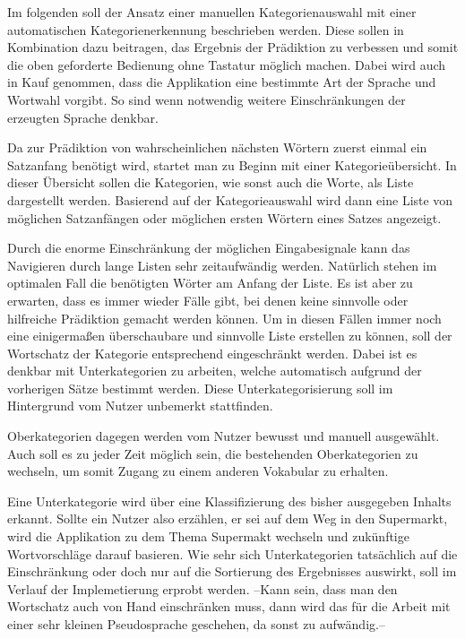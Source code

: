     	Im folgenden soll der Ansatz einer manuellen Kategorienauswahl mit einer automatischen Kategorienerkennung beschrieben werden. Diese sollen in Kombination dazu beitragen, das Ergebnis der Prädiktion zu verbessen und somit die oben geforderte Bedienung ohne Tastatur möglich machen. Dabei wird auch in Kauf genommen, dass die Applikation eine bestimmte Art der Sprache und Wortwahl vorgibt. So sind wenn notwendig weitere Einschränkungen der erzeugten Sprache denkbar.
        
    	Da zur Prädiktion von wahrscheinlichen nächsten Wörtern zuerst einmal ein Satzanfang benötigt wird, startet man zu Beginn mit einer Kategorieübersicht. In dieser Übersicht sollen die Kategorien, wie sonst auch die Worte, als Liste dargestellt werden. Basierend auf der Kategorieauswahl wird dann eine Liste von möglichen Satzanfängen oder möglichen ersten Wörtern eines Satzes angezeigt. 
        
        Durch die enorme Einschränkung der möglichen Eingabesignale kann das Navigieren durch lange Listen sehr zeitaufwändig werden. Natürlich stehen im optimalen Fall die benötigten Wörter am Anfang der Liste. Es ist aber zu erwarten, dass es immer wieder Fälle gibt, bei denen keine sinnvolle oder hilfreiche Prädiktion gemacht werden können. Um in diesen Fällen immer noch eine einigermaßen überschaubare und sinnvolle Liste erstellen zu können, soll der Wortschatz der Kategorie entsprechend eingeschränkt werden. Dabei ist es denkbar mit Unterkategorien zu arbeiten, welche automatisch aufgrund der vorherigen Sätze bestimmt werden. Diese Unterkategorisierung soll im Hintergrund vom Nutzer unbemerkt stattfinden. 
        
        Oberkategorien dagegen werden vom Nutzer bewusst und manuell ausgewählt. Auch soll es zu jeder Zeit möglich sein, die bestehenden Oberkategorien zu wechseln, um somit Zugang zu einem anderen Vokabular zu erhalten.
        
        Eine Unterkategorie wird über eine Klassifizierung des bisher ausgegeben Inhalts erkannt. Sollte ein Nutzer also erzählen, er sei auf dem Weg in den Supermarkt, wird die Applikation zu dem Thema Supermakt wechseln und zukünftige Wortvorschläge darauf basieren. Wie sehr sich Unterkategorien tatsächlich auf die Einschränkung oder doch nur auf die Sortierung des Ergebnisses auswirkt, soll im Verlauf der Implemetierung erprobt werden. --Kann sein, dass man den Wortschatz auch von Hand einschränken muss, dann wird das für die Arbeit mit einer sehr kleinen Pseudosprache geschehen, da sonst zu aufwändig.--  
        

